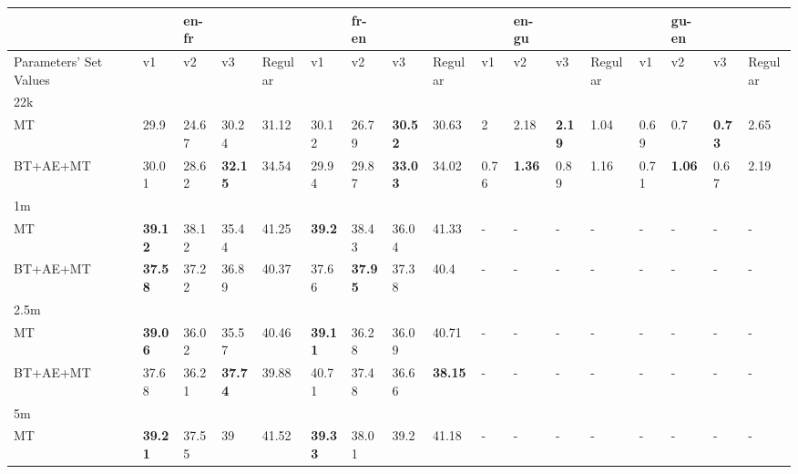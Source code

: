 \clearpage
\setlength\rotFPtop{242pt}
\begin{sidewaystable}[htbp]
\small
\begin{tabular}{l  B lll|l|lll|l|lll|l|lll|l}
\toprule
&&& \textbf{en-fr} & &&  & \textbf{fr-en} & && & \textbf{en-gu} &&&& \textbf{gu-en} && \\\hline
Parameters' Set Values &  & v1 & v2 & v3 &Regular& v1 & v2 & v3 &Regular& v1 & v2    & v3 &Regular& v1 & v2    & v3&Regular \\\hline\hline
22k  &  && &&&   &&&   &&&   & \\\hline
MT  &&29.9&24.67&30.24&31.12&30.12&26.79 &\textbf{30.52}&30.63&2&2.18&\textbf{2.19}&1.04&0.69&0.7 &\textbf{0.73}&2.65 \\
BT+AE+MT &&30.01&28.62&\textbf{32.15}&34.54&29.94&29.87&\textbf{33.03}&34.02&0.76&\textbf{1.36}&0.89&1.16 &0.71&\textbf{1.06}&0.67&2.19\\\hline\hline
1m  & &&&&&&&&&&&&\\\hline
MT & &\textbf{39.12}& 38.12&35.44 &41.25& \textbf{39.2}&38.43&36.04&41.33&-&-&-&-&-&-&-&-\\
BT+AE+MT & & \textbf{37.58}& 37.22& 36.89&40.37& 37.66& \textbf{37.95}& 37.38&40.4&-&-&-&-&-&-&-&-\\\hline\hline
2.5m  &&&&&&&&&&&&   &\\\hline
MT &  &\textbf{39.06}&36.02  &35.57&40.46&\textbf{39.11} &36.28&36.09&40.71&-&-&-&-&-&-&-&-\\
BT+AE+MT &  &37.68 & 36.21& \textbf{37.74} &39.88&40.71&37.48 &36.66& \textbf{38.15}&-&-&-&-&-&-&-&-\\\hline\hline
5m &&&&&&&&&&&&&\\\hline
MT  &&\textbf{39.21} &37.55&39&41.52&\textbf{39.33} &38.01&39.2&41.18&-&-&-&-&-&-&-&-\\

\end{tabular}
\end{sidewaystable}
